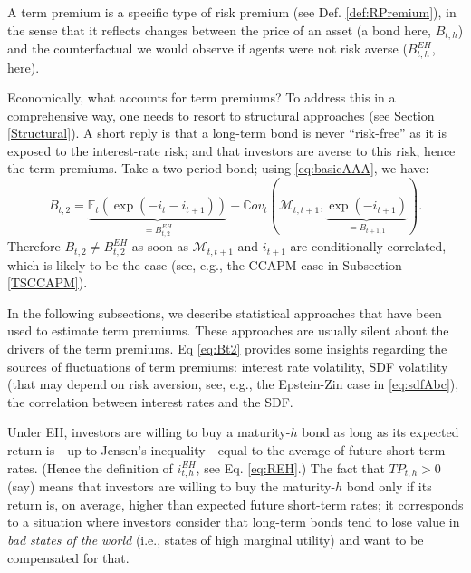 \documentclass[
  12pt,
]{book}
\theoremstyle{definition}
\theoremstyle{definition}
\theoremstyle{definition}
\theoremstyle{definition}
\theoremstyle{remark}
\begin{document}
A term premium is a specific type of risk premium (see Def. \ref{def:RPremium}), in the sense that it reflects changes between the price of an asset (a bond here, \(B_{t,h}\)) and the counterfactual we would observe if agents were not risk averse (\(B_{t,h}^{EH}\), here).

Economically, what accounts for term premiums? To address this in a comprehensive way, one needs to resort to structural approaches (see Section \ref{Structural}). A short reply is that a long-term bond is never ``risk-free'' as it is exposed to the interest-rate risk; and that investors are averse to this risk, hence the term premiums. Take a two-period bond; using \eqref{eq:basicAAA}, we have:
\begin{equation}
B_{t,2} = \underbrace{\mathbb{E}_t(\exp(-i_t-i_{t+1}))}_{= B^{EH}_{t,2}} + \mathbb{C}ov_t(\mathcal{M}_{t,t+1},\underbrace{\exp(-i_{t+1})}_{=B_{t+1,1}}).\label{eq:Bt2}
\end{equation}
Therefore \(B_{t,2} \ne B_{t,2}^{EH}\) as soon as \(\mathcal{M}_{t,t+1}\) and \(i_{t+1}\) are conditionally correlated, which is likely to be the case (see, e.g., the CCAPM case in Subsection \ref{TSCCAPM}).

In the following subsections, we describe statistical approaches that have been used to estimate term premiums. These approaches are usually silent about the drivers of the term premiums. Eq \eqref{eq:Bt2} provides some insights regarding the sources of fluctuations of term premiums: interest rate volatility, SDF volatility (that may depend on risk aversion, see, e.g., the Epstein-Zin case in \eqref{eq:sdfAbc}), the correlation between interest rates and the SDF.

Under EH, investors are willing to buy a maturity-\(h\) bond as long as its expected return is---up to Jensen's inequality---equal to the average of future short-term rates. (Hence the definition of \(i^{EH}_{t,h}\), see Eq. \eqref{eq:REH}.) The fact that \(TP_{t,h}>0\) (say) means that investors are willing to buy the maturity-\(h\) bond only if its return is, on average, higher than expected future short-term rates; it corresponds to a situation where investors consider that long-term bonds tend to lose value in \emph{bad states of the world} (i.e., states of high marginal utility) and want to be compensated for that.
\end{document}
